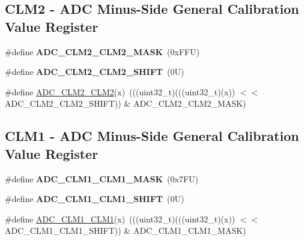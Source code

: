 \subsection*{C\+L\+M2 -\/ A\+DC Minus-\/\+Side General Calibration Value Register}
\begin{DoxyCompactItemize}
\item 
\mbox{\label{group___a_d_c___register___masks_ga815d6f1bf2d38384c8fd0dd4f07f7a08}} 
\#define {\bfseries A\+D\+C\+\_\+\+C\+L\+M2\+\_\+\+C\+L\+M2\+\_\+\+M\+A\+SK}~(0x\+F\+F\+U)
\item 
\mbox{\label{group___a_d_c___register___masks_ga945ed262c088eecda09d679df33ab193}} 
\#define {\bfseries A\+D\+C\+\_\+\+C\+L\+M2\+\_\+\+C\+L\+M2\+\_\+\+S\+H\+I\+FT}~(0\+U)
\item 
\#define \mbox{\hyperlink{group___a_d_c___register___masks_ga2366c7a7142228c95c81d4d11c90b2b1}{A\+D\+C\+\_\+\+C\+L\+M2\+\_\+\+C\+L\+M2}}(x)~(((uint32\+\_\+t)(((uint32\+\_\+t)(x)) $<$$<$ A\+D\+C\+\_\+\+C\+L\+M2\+\_\+\+C\+L\+M2\+\_\+\+S\+H\+I\+FT)) \& A\+D\+C\+\_\+\+C\+L\+M2\+\_\+\+C\+L\+M2\+\_\+\+M\+A\+SK)
\end{DoxyCompactItemize}
\subsection*{C\+L\+M1 -\/ A\+DC Minus-\/\+Side General Calibration Value Register}
\begin{DoxyCompactItemize}
\item 
\mbox{\label{group___a_d_c___register___masks_gaf576a4eb27b1478ea37a1b35bf6b869f}} 
\#define {\bfseries A\+D\+C\+\_\+\+C\+L\+M1\+\_\+\+C\+L\+M1\+\_\+\+M\+A\+SK}~(0x7\+F\+U)
\item 
\mbox{\label{group___a_d_c___register___masks_gae83765be6a54aab249c89a0f47afb023}} 
\#define {\bfseries A\+D\+C\+\_\+\+C\+L\+M1\+\_\+\+C\+L\+M1\+\_\+\+S\+H\+I\+FT}~(0\+U)
\item 
\#define \mbox{\hyperlink{group___a_d_c___register___masks_gac77d03fd2d07583049ec6496092b3a40}{A\+D\+C\+\_\+\+C\+L\+M1\+\_\+\+C\+L\+M1}}(x)~(((uint32\+\_\+t)(((uint32\+\_\+t)(x)) $<$$<$ A\+D\+C\+\_\+\+C\+L\+M1\+\_\+\+C\+L\+M1\+\_\+\+S\+H\+I\+FT)) \& A\+D\+C\+\_\+\+C\+L\+M1\+\_\+\+C\+L\+M1\+\_\+\+M\+A\+SK)
\end{DoxyCompactItemize}
